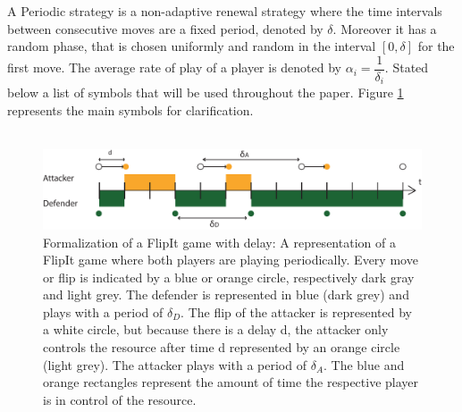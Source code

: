  A Periodic strategy is a non-adaptive renewal strategy where the time intervals between consecutive moves are a fixed period, denoted by $\delta$. Moreover it has a random phase, that is chosen uniformly and random in the interval $[0,\delta]$ for the first move. The average rate of play of a player is denoted by $\alpha_{i} = \dfrac{1}{\delta_{i}}$. Stated below a list of symbols that will be used throughout the paper. Figure \ref{FlipItDelay} represents the main symbols for clarification.\\
~~\\
\begin{figure}[hbtp]
\centering
\includegraphics[scale=0.7]{Images/DefFlip.pdf}
\caption{Formalization of a FlipIt game with delay: A representation of a FlipIt game where both players are playing periodically. Every move or flip is indicated by a blue or orange circle, respectively dark gray and light grey.  The defender is represented in blue (dark grey) and plays with a period of $\delta_{D}$. The flip of the attacker is represented by a white circle, but because there is a delay d, the attacker only controls the resource after time d represented by an orange circle (light grey). The attacker plays with a period of $\delta_{A}$. The blue and orange rectangles represent the amount of time the respective player is in control of the resource.}
\label{FlipItDelay}
\end{figure}

